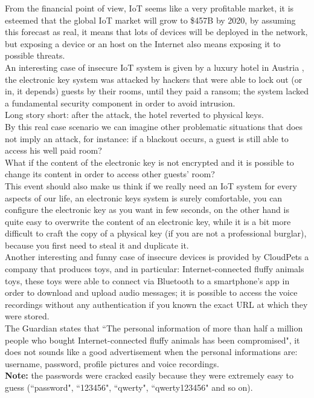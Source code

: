 \documentclass[12pt]{report}
\begin{document}
From the financial point of view, IoT seems like a very profitable market, it is esteemed that the global IoT market will grow to \$457B by 2020\cite{forbes}, by assuming this forecast as real, it means that lots of devices will be deployed in the network, but exposing a device
or an host on the Internet also means exposing it to possible threats.\\
An interesting case of insecure IoT system is given by a luxury hotel in Austria \cite{whydoiot}, the electronic key system was attacked
by hackers that were able to lock out (or in, it depends) guests by their rooms, until they paid a ransom; the system lacked a fundamental security
component in order to avoid intrusion.\\
Long story short: after the attack, the hotel reverted to physical keys.\\
By this real case scenario we can imagine other problematic situations that does not imply an attack, for instance: if a blackout occurs, a guest is still able to access	his well paid room?\\
What if the content of the electronic key is not encrypted and it is possible to change its content in order to access other guests' room?\\
This event should also make us think if we really need an IoT system for every aspects of our life, an electronic keys system is
surely comfortable, you can configure the electronic key as you want in few seconds, on the other hand is quite easy to overwrite the content
of an electronic key, while it is a bit more difficult to craft the copy of a physical key (if you are not a professional burglar), because you first need to steal it and duplicate it.\\
Another interesting and funny case of insecure devices is provided by CloudPets\cite{toys} a company that produces toys, and in particular: Internet-connected fluffy animals toys,
these toys were able to connect via Bluetooth to a smartphone's app in order to download and upload audio messages; it is possible to access the voice recordings without any authentication if you known the exact URL at which they were stored.\\
The Guardian states that ``The personal information of more than half a million people who bought Internet-connected fluffy animals has been compromised", it does not sounds like a good advertisement
when the personal informations are: username, password, profile pictures and voice recordings.\\
\textbf{Note:} the passwords were cracked easily because they were extremely easy to guess (``password", ``123456", ``qwerty", ``qwerty123456" and so on).\\
\end{document}
